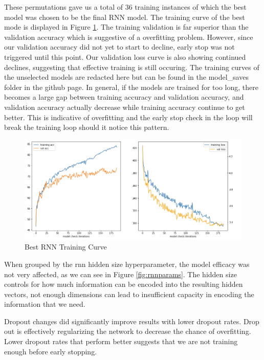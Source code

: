 \documentclass[a4paper,10pt]{article}
\begin{document}
\par 
\justify
These permutations gave us a total of 36 training instances of which the best model was chosen to be the final RNN model. The training curve of the best mode is displayed in Figure \ref{fig:rnnbest}. The training validation is far superior than the validation accuracy which is suggestive of a overfitting problem. However, since our validation accuracy did not yet to start to decline, early stop was not triggered until this point. Our validation loss curve is also showing continued declines, suggesting that effective training is still occuring. The training curves of the unselected models are redacted here but can be found in the model\_saves folder in the github page. In general, if the models are trained for too long, there becomes a large gap between training accuracy and validation accuracy, and validation accuracy actually decrease while training accuracy continue to get better. This is indicative of overfitting and the early stop check in the loop will break the training loop should it notice this pattern.

\begin{figure}[h]
    \centering
    \includegraphics[scale=0.4]{rnn_best}
    \caption{Best RNN Training Curve}
    \label{fig:rnnbest}
\end{figure}

\par 
\justify
When grouped by the rnn hidden size hyperparameter, the model efficacy was not very affected, as we can see in Figure \ref{fig:rnnparams}. The hidden size controls for how much information can be encoded into the resulting hidden vectors, not enough dimensions can lead to insufficient capacity in encoding the information that we need. 

\par 
\justify
Dropout changes did significantly improve results with lower dropout rates. Drop out is effectively regularizing the network to decrease the chance of overfitting. Lower dropout rates that perform better suggests that we are not training enough before early stopping. 
\end{document}
